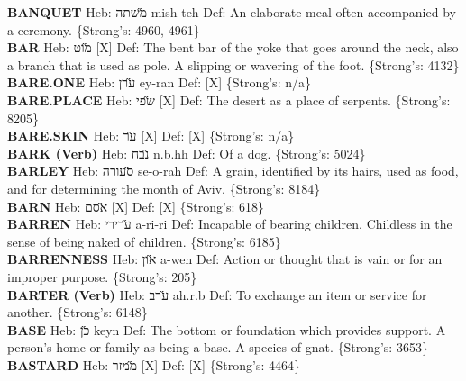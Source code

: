 {\textbf{BANQUET} Heb: {\large\H משתה} mish-teh Def: An elaborate meal often accompanied by a ceremony. \{Strong's: 4960, 4961\}\hfill{}\\

\textbf{BAR} Heb: {\large\H מוט} {[}X{]} Def: The bent bar of the yoke that goes around the neck, also a branch that is used as pole. A slipping or wavering of the foot. \{Strong's: 4132\}\hfill{}\\

\textbf{BARE.ONE} Heb: {\large\H ערן} ey-ran Def: {[}X{]} \{Strong's: n/a\}\hfill{}\\

\textbf{BARE.PLACE} Heb: {\large\H שפי} {[}X{]} Def: The desert as a place of serpents. \{Strong's: 8205\}\hfill{}\\

\textbf{BARE.SKIN} Heb: {\large\H ער} {[}X{]} Def: {[}X{]} \{Strong's: n/a\}\hfill{}\\

\textbf{BARK (Verb)} Heb: {\large\H נבח} n.b.hh Def: Of a dog. \{Strong's: 5024\}\hfill{}\\

\textbf{BARLEY} Heb: {\large\H סעורה} se-o-rah Def: A grain, identified by its hairs, used as food, and for determining the month of Aviv. \{Strong's: 8184\}\hfill{}\\

\textbf{BARN} Heb: {\large\H אסם} {[}X{]} Def: {[}X{]} \{Strong's: 618\}\hfill{}\\

\textbf{BARREN} Heb: {\large\H ערירי} a-ri-ri Def: Incapable of bearing children. Childless in the sense of being naked of children. \{Strong's: 6185\}\hfill{}\\

\textbf{BARRENNESS} Heb: {\large\H און} a-wen Def: Action or thought that is vain or for an improper purpose. \{Strong's: 205\}\hfill{}\\

\textbf{BARTER (Verb)} Heb: {\large\H ערב} ah.r.b Def: To exchange an item or service for another. \{Strong's: 6148\}\hfill{}\\

\textbf{BASE} Heb: {\large\H כן} keyn Def: The bottom or foundation which provides support. A person's home or family as being a base. A species of gnat. \{Strong's: 3653\}\hfill{}\\

\textbf{BASTARD} Heb: {\large\H ממזר} {[}X{]} Def: {[}X{]} \{Strong's: 4464\}\hfill{}\\

}
